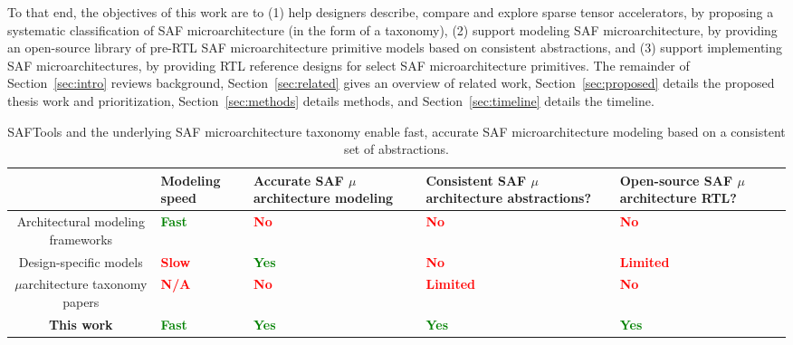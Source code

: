 To that end, the objectives of this work are to (1) help designers describe, compare and explore sparse tensor accelerators, by proposing a systematic classification of SAF microarchitecture (in the form of a taxonomy), (2) support modeling SAF microarchitecture, by providing an open-source library of pre-RTL SAF microarchitecture primitive models based on consistent abstractions, and (3) support implementing SAF microarchitectures, by providing RTL reference designs for select SAF microarchitecture primitives. The remainder of Section~\ref{sec:intro} reviews background, Section~\ref{sec:related} gives an overview of related work, Section~\ref{sec:proposed} details the proposed thesis work and prioritization, Section~\ref{sec:methods} details methods, and Section~\ref{sec:timeline} details the timeline.

\begin{table*}[ht]
\begin{tabular}{c|p{2.5cm}|p{2.5cm}|p{2.5cm}|p{2.5cm}}
 & Modeling speed & Accurate SAF $\mu$architecture modeling & Consistent SAF $\mu$architecture abstractions? & Open-source SAF $\mu$architecture RTL?\\ \hline \hline
Architectural modeling frameworks & \textcolor{green}{\textbf{Fast}} & \textcolor{red}{\textbf{No}} & \textcolor{red}{\textbf{No}} & \textcolor{red}{\textbf{No}} \\ \hline
Design-specific models & \textcolor{red}{\textbf{Slow}} & \textcolor{green}{\textbf{Yes}} & \textcolor{red}{\textbf{No}} & \textcolor{red}{\textbf{Limited}} \\ \hline
$\mu$architecture taxonomy papers & \textcolor{red}{\textbf{N/A}} & \textcolor{red}{\textbf{No}} & \textcolor{red}{\textbf{Limited}} & \textcolor{red}{\textbf{No}} \\ \hline
\textbf{This work} & \textcolor{green}{\textbf{Fast}} & \textcolor{green}{\textbf{Yes}} & \textcolor{green}{\textbf{Yes}} & \textcolor{green}{\textbf{Yes}} \\ \hline
\end{tabular}
\label{tab:thiswork}
\caption{SAFTools and the underlying SAF microarchitecture taxonomy enable fast, accurate SAF microarchitecture modeling based on a consistent set of abstractions.}
\centering
\end{table*}